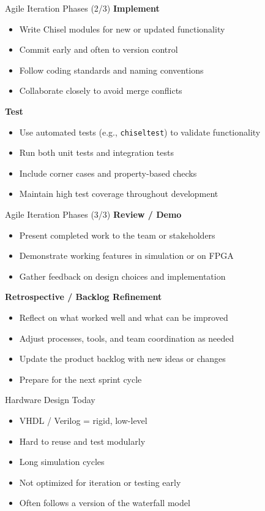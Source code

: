 \begin{frame}{Agile Iteration Phases (2/3)}
\textbf{Implement}
\begin{itemize}
    \item Write Chisel modules for new or updated functionality
    \item Commit early and often to version control
    \item Follow coding standards and naming conventions
    \item Collaborate closely to avoid merge conflicts
\end{itemize}

\medskip
\textbf{Test}
\begin{itemize}
    \item Use automated tests (e.g., \texttt{chiseltest}) to validate functionality
    \item Run both unit tests and integration tests
    \item Include corner cases and property-based checks
    \item Maintain high test coverage throughout development
\end{itemize}
\end{frame}

\begin{frame}{Agile Iteration Phases (3/3)}
\textbf{Review / Demo}
\begin{itemize}
    \item Present completed work to the team or stakeholders
    \item Demonstrate working features in simulation or on FPGA
    \item Gather feedback on design choices and implementation
\end{itemize}

\medskip
\textbf{Retrospective / Backlog Refinement}
\begin{itemize}
    \item Reflect on what worked well and what can be improved
    \item Adjust processes, tools, and team coordination as needed
    \item Update the product backlog with new ideas or changes
    \item Prepare for the next sprint cycle
\end{itemize}
\end{frame}

\begin{frame}{Hardware Design Today}
\begin{itemize}
    \item VHDL / Verilog = rigid, low-level
    \item Hard to reuse and test modularly
    \item Long simulation cycles
    \item Not optimized for iteration or testing early
    \item Often follows a version of the waterfall model
\end{itemize}
\end{frame}

